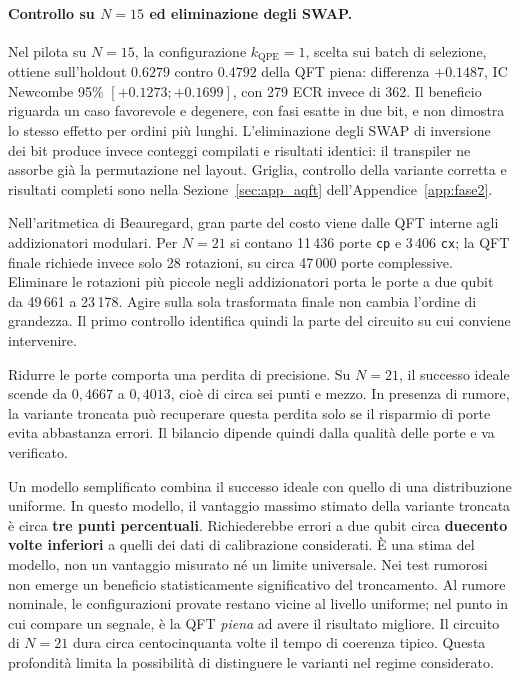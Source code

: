 \begin{onehalfspace}
\paragraph{Controllo su $N=15$ ed eliminazione degli SWAP.}
Nel pilota su $N=15$, la configurazione $k_{\mathrm{QPE}}=1$, scelta sui
batch di selezione, ottiene sull'holdout $0.6279$ contro $0.4792$ della
QFT piena: differenza $+0.1487$, IC Newcombe 95\%
$[+0.1273;+0.1699]$, con 279 ECR invece di 362. Il beneficio riguarda
un caso favorevole e degenere, con fasi esatte in due bit, e non dimostra
lo stesso effetto per ordini più lunghi. L'eliminazione degli SWAP di
inversione dei bit produce invece conteggi compilati e risultati
identici: il transpiler ne assorbe già la permutazione nel layout.
Griglia, controllo della variante corretta e risultati completi sono
nella Sezione~\ref{sec:app_aqft} dell'Appendice~\ref{app:fase2}.

Nell'aritmetica di Beauregard, gran parte del costo viene dalle QFT interne agli addizionatori modulari. Per $N=21$ si contano 11\,436 porte \texttt{cp} e 3\,406 \texttt{cx}; la QFT finale richiede invece solo 28 rotazioni, su circa 47\,000 porte complessive. Eliminare le rotazioni più piccole negli addizionatori porta le porte a due qubit da 49\,661 a 23\,178. Agire sulla sola trasformata finale non cambia l'ordine di grandezza. Il primo controllo identifica quindi la parte del circuito su cui conviene intervenire.

Ridurre le porte comporta una perdita di precisione. Su $N=21$, il successo ideale scende da $0{,}4667$ a $0{,}4013$, cioè di circa sei punti e mezzo. In presenza di rumore, la variante troncata può recuperare questa perdita solo se il risparmio di porte evita abbastanza errori. Il bilancio dipende quindi dalla qualità delle porte e va verificato.

Un modello semplificato combina il successo ideale con quello di una distribuzione uniforme. In questo modello, il vantaggio massimo stimato della variante troncata è circa \textbf{tre punti percentuali}. Richiederebbe errori a due qubit circa \textbf{duecento volte inferiori} a quelli dei dati di calibrazione considerati. È una stima del modello, non un vantaggio misurato né un limite universale. Nei test rumorosi non emerge un beneficio statisticamente significativo del troncamento. Al rumore nominale, le configurazioni provate restano vicine al livello uniforme; nel punto in cui compare un segnale, è la QFT \emph{piena} ad avere il risultato migliore. Il circuito di $N=21$ dura circa centocinquanta volte il tempo di coerenza tipico. Questa profondità limita la possibilità di distinguere le varianti nel regime considerato.


\end{onehalfspace}
